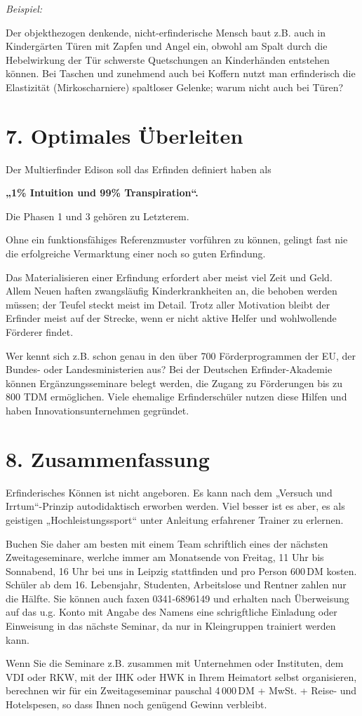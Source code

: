 \documentclass[11pt,a4paper]{article}
\begin{document}
\emph{Beispiel:}

Der objekthezogen denkende, nicht-erfinderische Mensch baut z.B. auch in
Kindergärten Türen mit Zapfen und Angel ein, obwohl am Spalt durch die
Hebelwirkung der Tür schwerste Quetschungen an Kinderhänden entstehen können.
Bei Taschen und zunehmend auch bei Koffern nutzt man erfinderisch die
Elastizität (Mirkoscharniere) spaltloser Gelenke; warum nicht auch bei Türen?

\section*{7. Optimales Überleiten}

Der Multierfinder Edison  soll das Erfinden definiert haben als
\begin{center}\bf  
  „1\% Intuition und  99\% Transpiration“.
\end{center}
Die Phasen 1 und 3 gehören zu Letzterem.

Ohne ein funktionsfähiges Referenzmuster vorführen zu können, gelingt fast
nie die erfolgreiche Vermarktung einer noch so guten Erfindung.

Das Materialisieren einer Erfindung erfordert aber meist viel Zeit und Geld.
Allem Neuen haften zwangsläufig Kinderkrankheiten an, die behoben werden
müssen; der Teufel steckt meist im Detail.  Trotz aller Motivation bleibt der
Erfinder meist auf der Strecke, wenn er nicht aktive Helfer und wohlwollende
Förderer findet.

Wer kennt sich z.B.  schon genau in den über 700 Förderprogrammen der EU, der
Bundes- oder Landesministerien aus?  Bei der Deutschen Erfinder-Akademie
können Ergänzungsseminare belegt werden, die Zugang zu Förderungen bis zu 800
TDM ermöglichen. Viele ehemalige Erfinderschüler nutzen diese Hilfen und haben
Innovationsunternehmen gegründet.

\section*{8. Zusammenfassung}

Erfinderisches Können ist nicht angeboren.  Es kann nach dem „Versuch und
Irrtum“-Prinzip autodidaktisch erworben werden.  Viel besser ist es aber, es
als geistigen „Hochleistungssport“ unter Anleitung erfahrener Trainer zu
erlernen.

Buchen Sie daher am besten mit einem Team schriftlich eines der nächsten
Zweitageseminare, werlche immer am Monatsende von Freitag, 11 Uhr bis
Sonnabend, 16 Uhr bei uns in Leipzig stattfinden und pro Person 600\,DM
kosten.  Schüler ab dem 16. Lebensjahr, Studenten, Arbeitslose und Rentner
zahlen nur die Hälfte. Sie können auch faxen 0341-6896149 und erhalten nach
Überweisung auf das u.g. Konto mit Angabe des Namens eine schrigftliche
Einladung oder Einweisung in das nächste Seminar, da nur in Kleingruppen
trainiert werden kann.

Wenn Sie die Seminare z.B. zusammen mit Unternehmen oder Instituten, dem VDI
oder RKW, mit der IHK oder HWK in Ihrem Heimatort selbst organisieren,
berechnen wir für ein Zweitageseminar pauschal 4\,000\,DM + MwSt. + Reise-
und Hotelspesen, so dass  Ihnen noch genügend Gewinn verbleibt.

\end{document}
